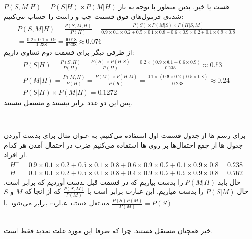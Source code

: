 \documentclass[]{article}
\begin{document}
$P(S, M | H) = P(S | H) \times P(M | H)$
هست یا خیر. بدین منظور با توجه به باز شده‌ی فرمول‌های فوق قسمت چپ و راست را حساب می‌کنیم:
\begin{gather*}
    P(S, M | H) = \frac{P(S, M, H)}{P(H)} = \frac{P(S) \times P(M | S) \times P(H | S, M)}{0.9 \times 0.1 \times 0.2 + 0.5 \times 0.1 \times 0.8 + 0.6 \times 0.9 \times 0.2 + 0.1 \times 0.9 \times 0.8}\\
    = \frac{0.2 \times 0.1 \times 0.9}{0.238} = \frac{0.018}{0.238} \approx 0.076
\end{gather*}
از طرفی دیگر برای قسمت دوم تساوی داریم:
\begin{gather*}
    P(S | H) = \frac{P(S, H)}{P(H)} = \frac{P(S) \times P(H | S)}{P(H)} = \frac{0.2 \times (0.9 \times 0.1 + 0.6 \times 0.9)}{0.238} \approx 0.53\\
    P(M | H) = \frac{P(M, H)}{P(H)} = \frac{P(M) \times P(H | M)}{P(H)} = \frac{0.1 \times (0.9 \times 0.2 + 0.5 \times 0.8)}{0.238} \approx 0.24\\
    P(S | H) \times P(M | H) = 0.1272
\end{gather*}
پس این دو عدد برابر نیستند و مستقل نیستند.


\\\noindent
\begin{latin}
    \centering
\end{latin}
برای رسم
ها
از جدول قسمت اول استفاده می‌کنیم. به عنوان مثال برای بدست آوردن جدول
ها
از جمع احتمال‌ها بر روی
ها
استفاده می‌کنیم ضرب در احتمال آمدن هر کدام از افراد.
\begin{gather*}
    H^+ = 0.9 \times 0.1 \times 0.2 + 0.5 \times 0.1 \times 0.8 + 0.6 \times 0.9 \times 0.2 + 0.1 \times 0.9 \times 0.8 = 0.238\\
    H^- = 0.1 \times 0.1 \times 0.2 + 0.5 \times 0.1 \times 0.8 + 0.4 \times 0.9 \times 0.2 + 0.9 \times 0.9 \times 0.8 = 0.762
\end{gather*}
حال باید
$P(M | H)$
را بدست بیاریم که در قسمت قبل بدست آوردیم که برابر
است. حال
$P(S | M)$
را بدست میاریم. این عبارت برابر است با
$\frac{P(S, M)}{P(M)}$
که از آنجا که
$M$ و $S$
مستقل هستند عبارت برابر می‌شود با
$\frac{P(S)P(M)}{P(M)} = P(S)$


\\\noindent
خیر همچنان مستقل هستند. چرا که صرفا این مورد علت تمدید فقط است.
\end{document}
